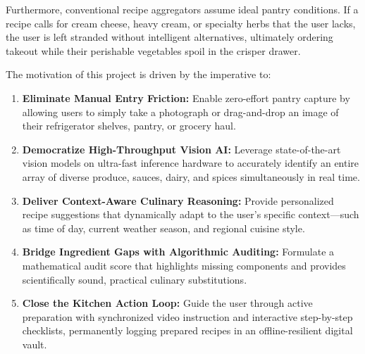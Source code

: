 Furthermore, conventional recipe aggregators assume ideal pantry conditions. If a recipe calls for cream cheese, heavy cream, or specialty herbs that the user lacks, the user is left stranded without intelligent alternatives, ultimately ordering takeout while their perishable vegetables spoil in the crisper drawer.

The motivation of this project is driven by the imperative to:
\begin{enumerate}
    \item \textbf{Eliminate Manual Entry Friction:} Enable zero-effort pantry capture by allowing users to simply take a photograph or drag-and-drop an image of their refrigerator shelves, pantry, or grocery haul.
    \item \textbf{Democratize High-Throughput Vision AI:} Leverage state-of-the-art vision models on ultra-fast inference hardware to accurately identify an entire array of diverse produce, sauces, dairy, and spices simultaneously in real time.
    \item \textbf{Deliver Context-Aware Culinary Reasoning:} Provide personalized recipe suggestions that dynamically adapt to the user's specific context—such as time of day, current weather season, and regional cuisine style.
    \item \textbf{Bridge Ingredient Gaps with Algorithmic Auditing:} Formulate a mathematical audit score that highlights missing components and provides scientifically sound, practical culinary substitutions.
    \item \textbf{Close the Kitchen Action Loop:} Guide the user through active preparation with synchronized video instruction and interactive step-by-step checklists, permanently logging prepared recipes in an offline-resilient digital vault.
\end{enumerate}

